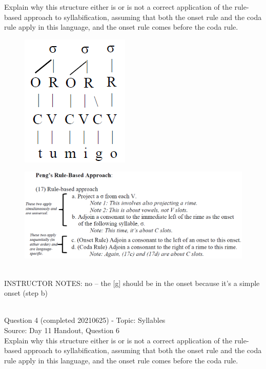 \documentclass[12pt]{article}
\begin{document}
Explain why this structure either is or is not a correct application of the rule-based approach to syllabification, assuming that both the onset rule and the coda rule apply in this language, and the onset rule comes before the coda rule.\\

\begin{figure}[H]
\includegraphics{../images/pengrules_tumigo_no.png}
\end{figure}
\begin{figure}[H]
\includegraphics{../images/peng_rules.png}
\end{figure}

~\\
INSTRUCTOR NOTES: no -- the [g] should be in the onset because it's a simple onset (step b)


~\\

{\large Question 4} (completed 20210625) - Topic: Syllables\\
Source: Day 11 Handout, Question 6\\

Explain why this structure either is or is not a correct application of the rule-based approach to syllabification, assuming that both the onset rule and the coda rule apply in this language, and the onset rule comes before the coda rule.\\
\end{document}
